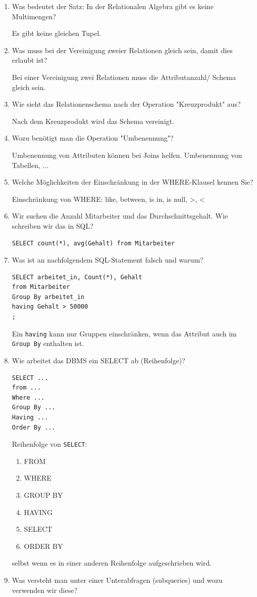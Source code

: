 \documentclass[a4paper]{article}
\begin{document}
\begin{enumerate}
    Selektion und Projektion sind nicht kommutativ.
    \item Was bedeutet der Satz: In der Relationalen Algebra gibt es keine Multimengen?
    
    Es gibt keine gleichen Tupel.
    \item Was muss bei der Vereinigung zweier Relationen gleich sein, damit dies erlaubt ist?
    
    Bei einer Vereinigung zwei Relationen muss die Attributanzahl/ Schema gleich sein.
    \item Wie sieht das Relationenschema nach der Operation "Kreuzprodukt" aus?
    
    Nach dem Kreuzprodukt wird das Schema vereinigt.
    \item Wozu benötigt man die Operation "Umbenennung"?
    
    Umbenennung von Attributen können bei Joins helfen. Umbenennung von Tabellen, ...
    \item Welche Möglichkeiten der Einschränkung in der WHERE-Klausel kennen Sie?
    
    Einschränkung von WHERE: like, between, is in, is null, >, <
    \item Wir suchen die Anzahl Mitarbeiter und das Durchschnittsgehalt. Wie schreiben wir das in SQL?
    
\begin{lstlisting}
SELECT count(*), avg(Gehalt) from Mitarbeiter
\end{lstlisting}
    \item Was ist an nachfolgendem SQL-Statement falsch und warum?
\begin{lstlisting}
SELECT arbeitet_in, Count(*), Gehalt
from Mitarbeiter
Group By arbeitet_in
having Gehalt > 50000
;
\end{lstlisting}
    
    Ein \lstinline|having| kann nur Gruppen einschränken, wenn das Attribut auch im \lstinline|Group By| enthalten ist.

    \newpage
    \item Wie arbeitet das DBMS ein SELECT ab (Reihenfolge)?
\begin{lstlisting}
SELECT ...
from ...
Where ...
Group By ...
Having ...
Order By ...
\end{lstlisting}
    
    Reihenfolge von \lstinline|SELECT|:
    \begin{enumerate}
        \item FROM
        \item WHERE
        \item GROUP BY
        \item HAVING
        \item SELECT
        \item ORDER BY
    \end{enumerate}
    selbst wenn es in einer anderen Reihenfolge aufgeschrieben wird.
    \item Was versteht man unter einer Unterabfragen (subqueries) und wozu verwenden wir diese?


\end{enumerate}
\end{document}
